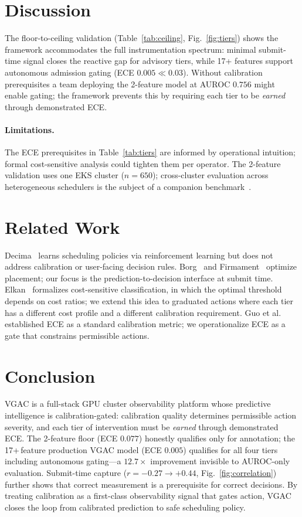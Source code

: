 \documentclass[sigconf]{acmart}
\begin{document}
\section{Discussion}
The floor-to-ceiling validation (Table~\ref{tab:ceiling}, Fig.~\ref{fig:tiers}) shows the framework accommodates the full instrumentation spectrum: minimal submit-time signal closes the reactive gap for advisory tiers, while 17+ features support autonomous admission gating (ECE $0.005 \ll 0.03$). Without calibration prerequisites a team deploying the 2-feature model at AUROC $0.756$ might enable gating; the framework prevents this by requiring each tier to be \emph{earned} through demonstrated ECE.
\paragraph{Limitations.} The ECE prerequisites in Table~\ref{tab:tiers} are informed by operational intuition; formal cost-sensitive analysis could tighten them per operator. The 2-feature validation uses one EKS cluster ($n=650$); cross-cluster evaluation across heterogeneous schedulers is the subject of a companion benchmark~\cite{espira2026benchmark}.

\section{Related Work}
Decima~\cite{decima} learns scheduling policies via reinforcement learning but does not address calibration or user-facing decision rules. Borg~\cite{borg} and Firmament~\cite{firmament} optimize placement; our focus is the prediction-to-decision interface at submit time. Elkan~\cite{elkan2001} formalizes cost-sensitive classification, in which the optimal threshold depends on cost ratios; we extend this idea to graduated actions where each tier has a different cost profile and a different calibration requirement. Guo et al.~\cite{guo2017calibration} established ECE as a standard calibration metric; we operationalize ECE as a gate that constrains permissible actions.

\section{Conclusion}
VGAC is a full-stack GPU cluster observability platform whose predictive intelligence is calibration-gated: calibration quality determines permissible action severity, and each tier of intervention must be \emph{earned} through demonstrated ECE. The 2-feature floor (ECE $0.077$) honestly qualifies only for annotation; the 17+\,feature production VGAC model (ECE $0.005$) qualifies for all four tiers including autonomous gating---a $12.7\times$ improvement invisible to AUROC-only evaluation. Submit-time capture ($r=-0.27 \to +0.44$, Fig.~\ref{fig:correlation}) further shows that correct measurement is a prerequisite for correct decisions. By treating calibration as a first-class observability signal that gates action, VGAC closes the loop from calibrated prediction to safe scheduling policy.
\end{document}
